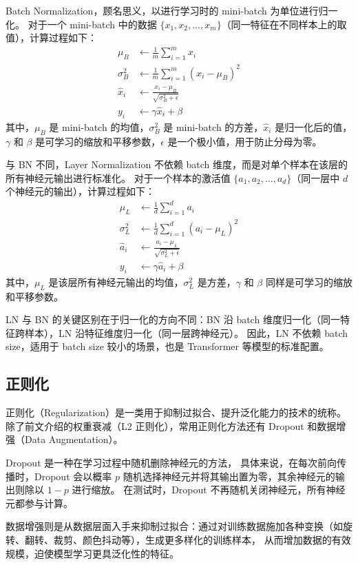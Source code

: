 Batch Normalization，顾名思义，以进行学习时的 mini-batch 为单位进行归一化。
对于一个 mini-batch 中的数据 $\{x_1, x_2, \ldots, x_m\}$（同一特征在不同样本上的取值），计算过程如下：
\begin{align*}
	\mu_B      & \leftarrow \frac{1}{m} \sum_{i=1}^m x_i                     \\
	\sigma_B^2 & \leftarrow \frac{1}{m} \sum_{i=1}^m (x_i - \mu_B)^2         \\
	\hat{x}_i  & \leftarrow \frac{x_i - \mu_B}{\sqrt{\sigma_B^2 + \epsilon}} \\
	y_i        & \leftarrow \gamma \hat{x}_i + \beta
\end{align*}
其中，$\mu_B$ 是 mini-batch 的均值，$\sigma_B^2$ 是 mini-batch 的方差，$\hat{x}_i$ 是归一化后的值，$\gamma$ 和 $\beta$ 是可学习的缩放和平移参数，$\epsilon$ 是一个极小值，用于防止分母为零。

与 BN 不同，Layer Normalization 不依赖 batch 维度，而是对单个样本在该层的所有神经元输出进行标准化。
对于一个样本的激活值 $\{a_1, a_2, \ldots, a_d\}$（同一层中 $d$ 个神经元的输出），计算过程如下：
\begin{align*}
	\mu_L      & \leftarrow \frac{1}{d} \sum_{i=1}^d a_i                     \\
	\sigma_L^2 & \leftarrow \frac{1}{d} \sum_{i=1}^d (a_i - \mu_L)^2         \\
	\hat{a}_i  & \leftarrow \frac{a_i - \mu_L}{\sqrt{\sigma_L^2 + \epsilon}} \\
	y_i        & \leftarrow \gamma \hat{a}_i + \beta
\end{align*}
其中，$\mu_L$ 是该层所有神经元输出的均值，$\sigma_L^2$ 是方差，$\gamma$ 和 $\beta$ 同样是可学习的缩放和平移参数。

LN 与 BN 的关键区别在于归一化的方向不同：BN 沿 batch 维度归一化（同一特征跨样本），LN 沿特征维度归一化（同一层跨神经元）。
因此，LN 不依赖 batch size，适用于 batch size 较小的场景，也是 Transformer 等模型的标准配置。

\subsection{正则化}
正则化（Regularization）是一类用于抑制过拟合、提升泛化能力的技术的统称。
除了前文介绍的权重衰减（L2 正则化），常用正则化方法还有 Dropout 和数据增强（Data Augmentation）。

Dropout 是一种在学习过程中随机删除神经元的方法，
具体来说，在每次前向传播时，Dropout 会以概率 $p$ 随机选择神经元并将其输出置为零，其余神经元的输出则除以 $1-p$ 进行缩放。
在测试时，Dropout 不再随机关闭神经元，所有神经元都参与计算。

数据增强则是从数据层面入手来抑制过拟合：通过对训练数据施加各种变换（如旋转、翻转、裁剪、颜色抖动等），生成更多样化的训练样本，
从而增加数据的有效规模，迫使模型学习更具泛化性的特征。

